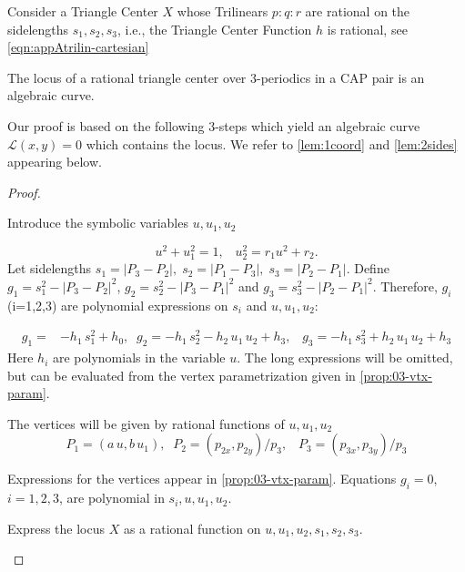 


Consider a Triangle Center $X$ whose Trilinears $p:q:r$ are rational on the sidelengths $s_1,s_2,s_3$, i.e., the Triangle Center Function $h$ is rational, see  
\cref{eqn:appAtrilin-cartesian}

\begin{theorem}
The locus of a rational triangle center
over 3-periodics in a CAP pair is an algebraic curve.
\label{thm:04-rational-center}
\end{theorem}

Our proof is based on the following 3-steps which yield an algebraic curve $\mathcal{L}(x,y)=0$ which contains the locus. We refer to \cref{lem:1coord} and \cref{lem:2sides} appearing below. %

\begin{proof}

		
\begin{step}

 
Introduce the symbolic variables $u, u_1, u_2$
 
\begin{equation*}
    u^2 + u_1^2 = 1,\;\;\;   u_2^2 = r_1u^2+r_2.
\end{equation*} %
Let sidelengths $s_1=|P_3-P_2|,\; s_2=|P_1-P_3|,\;s_3=|P_2-P_1|$. Define $g_1=s_1^2-|P_3-P_2|^2$, $g_2=s_2^2-|P_3-P_1|^2$
and $g_3=s_3^2-|P_2-P_1|^2$. 
Therefore, $g_i$(i=1,2,3)   are polynomial expressions on $s_i$ and $u,u_1,u_2$:


	\begin{align*}
		g_1=&    -h_1 \, s_1^2 
		+h_0,\;\;g_2=- h_1\, s_2^2 -
		h_2 \,u_1 \,u_2 +h_3,\;\;\;g_3=- h_1 \,s_3^2 + h_2\,  u_1\, u_2+h_3\end{align*}
Here $h_i$ are polynomials in the variable $u$.	The long expressions will be 
omitted, but can be evaluated from the vertex parametrization given in \cref{prop:03-vtx-param}.	
\end{step}
 
\noindent The vertices will be given by rational functions of   $u, u_1, u_2$ 
\begin{equation*} P_1 = (a\,u, b\,u_1),\;\;P_2 = (p_{2x}, p_{2y})/p_3,\;\;\;P_3 = (p_{3x}, p_{3y})/p_3 
\end{equation*}
 
\noindent Expressions for the vertices appear in \cref{prop:03-vtx-param}. Equations $g_i=0$, $i=1,2,3$, are polynomial in $ s_i,u,u_1,u_2$.
 
\begin{step} Express the locus  $X$ as a  rational function on  $u,u_1, u_2, s_1, s_2, s_3$.
\end{step}


\end{proof}
